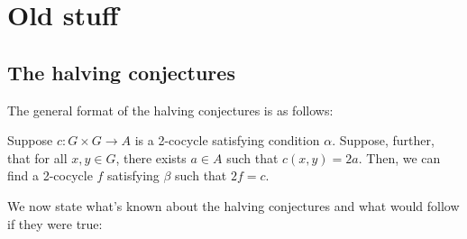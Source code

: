 \documentclass[10pt]{amsart}
\begin{document}
\appendix

\section{Old stuff}

\subsection{The halving conjectures}

The general format of the halving conjectures is as follows:

\begin{conjecture}
  Suppose $c: G \times G \to A$ is a 2-cocycle satisfying condition
  $\alpha$. Suppose, further, that for all $x,y \in G$, there exists
  $a \in A$ such that $c(x,y) = 2a$. Then, we can find a 2-cocycle $f$
  satisfying $\beta$ such that $2f = c$.
\end{conjecture}

We now state what's known about the halving conjectures and what would
follow if they were true:
\end{document}

